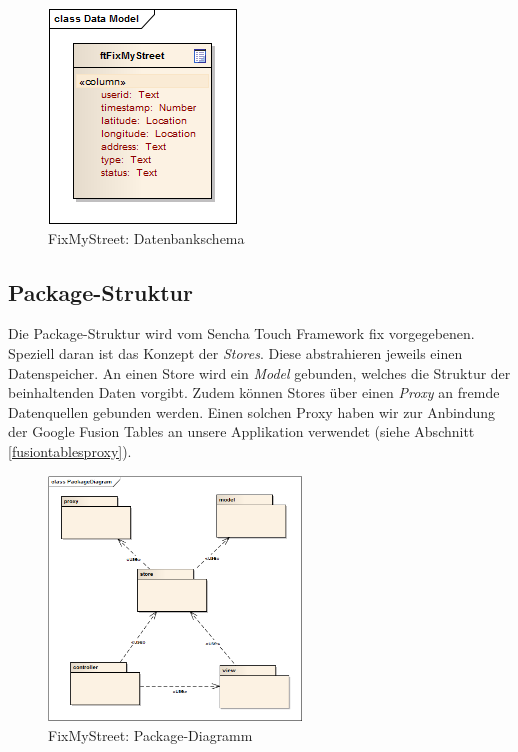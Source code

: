 \begin{figure}[H]
	\centering
	\includegraphics[scale=0.8]{images/usecase2-fixmystreet/uml/fixmystreet-datamodel}
	\caption{FixMyStreet: Datenbankschema}
	\label{fixmystreet-datamodel}
\end{figure}

\subsection{Package-Struktur}
Die Package-Struktur wird vom Sencha Touch Framework fix vorgegebenen. Speziell daran ist das Konzept der \emph{Stores}. Diese abstrahieren jeweils einen Datenspeicher. An einen Store wird ein \emph{Model} gebunden, welches die Struktur der beinhaltenden Daten vorgibt. Zudem können Stores über einen \emph{Proxy} an fremde Datenquellen gebunden werden. Einen solchen Proxy haben wir zur Anbindung der Google Fusion Tables an unsere Applikation verwendet (siehe Abschnitt \ref{fusiontablesproxy}).

\begin{figure}[H]
	\centering
	\includegraphics[width=0.6\textwidth]{images/usecase2-fixmystreet/uml/fixmystreet-packagediagram}
	\caption{FixMyStreet: Package-Diagramm}
	\label{fixmystreet-packagediagram}
\end{figure}

